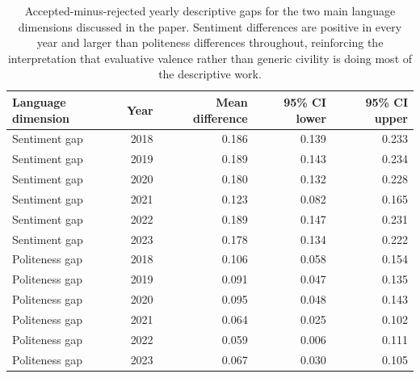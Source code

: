 \begin{table}[!htbp]
\centering
\begingroup
\normalsize
\renewcommand{\arraystretch}{1.20}
\setlength{\tabcolsep}{6pt}
\caption{Accepted-minus-rejected yearly descriptive gaps for the two main language dimensions discussed in the paper. Sentiment differences are positive in every year and larger than politeness differences throughout, reinforcing the interpretation that evaluative valence rather than generic civility is doing most of the descriptive work.}
\label{tab:app:yearlygaps}
\begin{tabular}{lrrrr}
\toprule
Language dimension & Year & Mean difference & 95\% CI lower & 95\% CI upper \\
\midrule
Sentiment gap & 2018 & 0.186 & 0.139 & 0.233 \\
Sentiment gap & 2019 & 0.189 & 0.143 & 0.234 \\
Sentiment gap & 2020 & 0.180 & 0.132 & 0.228 \\
Sentiment gap & 2021 & 0.123 & 0.082 & 0.165 \\
Sentiment gap & 2022 & 0.189 & 0.147 & 0.231 \\
Sentiment gap & 2023 & 0.178 & 0.134 & 0.222 \\
Politeness gap & 2018 & 0.106 & 0.058 & 0.154 \\
Politeness gap & 2019 & 0.091 & 0.047 & 0.135 \\
Politeness gap & 2020 & 0.095 & 0.048 & 0.143 \\
Politeness gap & 2021 & 0.064 & 0.025 & 0.102 \\
Politeness gap & 2022 & 0.059 & 0.006 & 0.111 \\
Politeness gap & 2023 & 0.067 & 0.030 & 0.105 \\
\bottomrule
\end{tabular}
\endgroup
\end{table}

